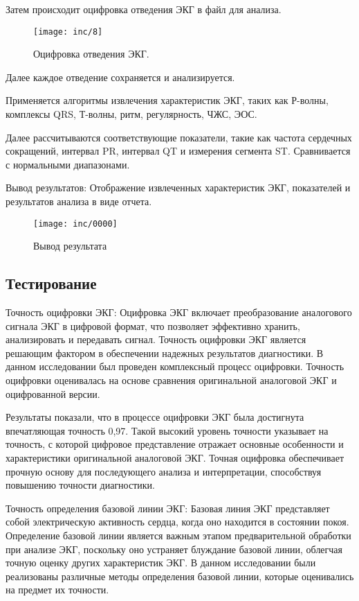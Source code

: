 Затем происходит оцифровка отведения ЭКГ в файл для анализа.

\begin{figure}
  \texttt{[image: inc/8]}
  \caption{Оцифровка отведения ЭКГ.}
  \label{fig:fig10}
\end{figure}

Далее каждое отведение сохраняется и анализируется.

Применяется алгоритмы извлечения характеристик ЭКГ, таких как Р-волны, комплексы QRS, Т-волны, ритм, регулярность, ЧЖС, ЭОС.

Далее рассчитываются соответствующие показатели, такие как частота сердечных сокращений, интервал PR, интервал QT и измерения сегмента ST.
Сравнивается с нормальными диапазонами.


Вывод результатов:
Отображение извлеченных характеристик ЭКГ, показателей и результатов анализа в виде отчета.

\begin{figure}
  \texttt{[image: inc/0000]}
  \caption{Вывод результата}
  \label{fig:fig11}
\end{figure}

\subsection{Тестирование}

Точность оцифровки ЭКГ:
Оцифровка ЭКГ включает преобразование аналогового сигнала ЭКГ в цифровой формат, что позволяет эффективно хранить, анализировать и передавать сигнал. Точность оцифровки ЭКГ является решающим фактором в обеспечении надежных результатов диагностики. В данном исследовании был проведен комплексный процесс оцифровки. Точность оцифровки оценивалась на основе сравнения оригинальной аналоговой ЭКГ и оцифрованной версии.

Результаты показали, что в процессе оцифровки ЭКГ была достигнута впечатляющая точность 0,97. Такой высокий уровень точности указывает на точность, с которой цифровое представление отражает основные особенности и характеристики оригинальной аналоговой ЭКГ. Точная оцифровка обеспечивает прочную основу для последующего анализа и интерпретации, способствуя повышению точности диагностики.

Точность определения базовой линии ЭКГ:
Базовая линия ЭКГ представляет собой электрическую активность сердца, когда оно находится в состоянии покоя. Определение базовой линии является важным этапом предварительной обработки при анализе ЭКГ, поскольку оно устраняет блуждание базовой линии, облегчая точную оценку других характеристик ЭКГ. В данном исследовании были реализованы различные методы определения базовой линии, которые оценивались на предмет их точности.

